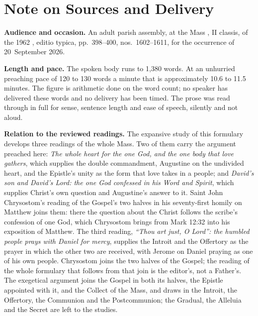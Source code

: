 
\section*{Note on Sources and Delivery}

{\footnotesize

\textbf{Audience and occasion.} An adult parish assembly, at the Mass
, II classis, of the 1962
, editio typica, pp.~398--400, nos.~1602--1611, for the
occurrence of 20~September 2026.

\textbf{Length and pace.} The spoken body runs to 1,380 words. At an
unhurried preaching pace of 120 to 130 words a minute that is approximately
10.6 to 11.5 minutes. The
figure is arithmetic done on the word count; no speaker has delivered these
words and no delivery has been timed. The prose was read through in full for
sense, sentence length and ease of speech, silently and not aloud.

\textbf{Relation to the reviewed readings.} The expansive study of this
formulary develops three readings of the whole Mass. Two of them carry the
argument preached here: \textit{The whole heart for the one God, and the one
body that love gathers}, which supplies the double commandment, Augustine on
the undivided heart, and the Epistle's unity as the form that love takes in a
people; and \textit{David's son and David's Lord: the one God confessed in his
Word and Spirit}, which supplies Christ's own question and Augustine's answer
to it. Saint John Chrysostom's reading of the Gospel's two halves in his
seventy-first homily on Matthew joins them: there the question about the
Christ follows the scribe's confession of one God, which Chrysostom brings
from Mark 12:32 into his exposition of Matthew. The third reading,
\textit{``Thou art just, O Lord'': the humbled people prays with Daniel for
mercy}, supplies the Introit and the Offertory as the prayer in which the
other two are received, with Jerome on Daniel praying as one of his own
people. Chrysostom joins the two halves of the Gospel; the reading of the
whole formulary that follows from that join is the editor's, not a
Father's. The exegetical argument joins the Gospel in both its
halves, the Epistle appointed with it, and the Collect of the Mass, and draws
in the Introit, the Offertory, the Communion and the Postcommunion; the
Gradual, the Alleluia and the Secret are left to the studies.

}
